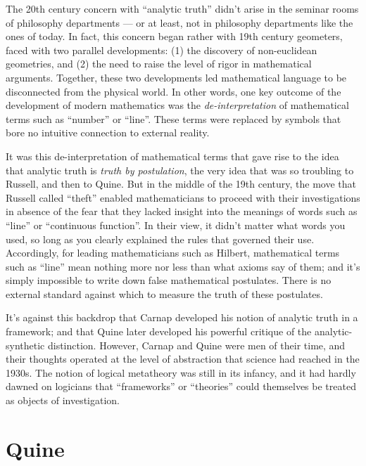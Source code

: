 The 20th century concern with ``analytic truth'' didn't arise in the
seminar rooms of philosophy departments --- or at least, not in
philosophy departments like the ones of today.  In fact, this concern
began rather with 19th century geometers, faced with two parallel
developments: (1) the discovery of non-euclidean geometries, and (2)
the need to raise the level of rigor in mathematical arguments.
Together, these two developments led mathematical language to be
disconnected from the physical world.  In other words, one key outcome
of the development of modern mathematics was the {\it
  de-interpretation} of mathematical terms such as ``number'' or
``line''.  These terms were replaced by symbols that bore no intuitive
connection to external reality.

It was this de-interpretation of mathematical terms that gave rise to
the idea that analytic truth is {\it truth by postulation}, the very
idea that was so troubling to Russell, and then to Quine.  But in the
middle of the 19th century, the move that Russell called ``theft''
enabled mathematicians to proceed with their investigations in absence
of the fear that they lacked insight into the meanings of words such
as ``line'' or ``continuous function''.  In their view, it didn't
matter what words you used, so long as you clearly explained the rules
that governed their use.  Accordingly, for leading mathematicians such
as Hilbert, mathematical terms such as ``line'' mean nothing more nor
less than what axioms say of them; and it's simply impossible to write
down false mathematical postulates.  There is no external standard
against which to measure the truth of these postulates.

It's against this backdrop that Carnap developed his notion of
analytic truth in a framework; and that Quine later developed his
powerful critique of the analytic-synthetic distinction.  However,
Carnap and Quine were men of their time, and their thoughts operated
at the level of abstraction that science had reached in the 1930s.
The notion of logical metatheory was still in its infancy, and it had
hardly dawned on logicians that ``frameworks'' or ``theories'' could
themselves be treated as objects of investigation.



\section*{Quine}

